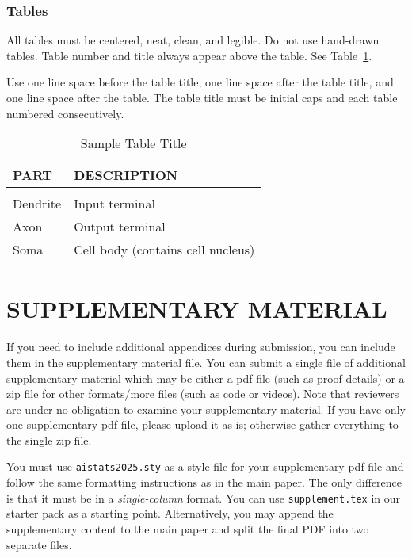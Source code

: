 \documentclass[twoside]{article}
\begin{document}
\subsubsection{Tables}

All tables must be centered, neat, clean, and legible. Do not use hand-drawn tables.
Table number and title always appear above the table.
See Table~\ref{sample-table}.

Use one line space before the table title, one line space after the table title,
and one line space after the table. The table title must be
initial caps and each table numbered consecutively.

\begin{table}[h]
\caption{Sample Table Title} \label{sample-table}
\begin{center}
\begin{tabular}{ll}
\textbf{PART}  &\textbf{DESCRIPTION} \\
\hline \\
Dendrite         &Input terminal \\
Axon             &Output terminal \\
Soma             &Cell body (contains cell nucleus) \\
\end{tabular}
\end{center}
\end{table}

\section{SUPPLEMENTARY MATERIAL}

If you need to include additional appendices during submission, you can include them in the supplementary material file.
You can submit a single file of additional supplementary material which may be either a pdf file (such as proof details) or a zip file for other formats/more files (such as code or videos). 
Note that reviewers are under no obligation to examine your supplementary material. 
If you have only one supplementary pdf file, please upload it as is; otherwise gather everything to the single zip file.

You must use \texttt{aistats2025.sty} as a style file for your supplementary pdf file and follow the same formatting instructions as in the main paper. 
The only difference is that it must be in a \emph{single-column} format.
You can use \texttt{supplement.tex} in our starter pack as a starting point.
Alternatively, you may append the supplementary content to the main paper and split the final PDF into two separate files.
\end{document}
